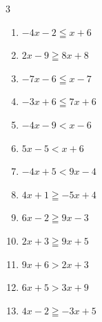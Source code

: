 \begin{multicols}{3}
\begin{enumerate}
  \item $-4x-2\leqq x+6$


  \item $2x-9\geqq 8x+8$


  \item $-7x-6\leqq x-7$


\columnbreak %

  \item $-3x+6\leqq 7x+6$

        \phantom{$\displaystyle x\geqq 0$}

  \item $-4x-9<x-6$


  \item $5x-5<x+6$


  \item $-4x+5<9x-4$


  \item $4x+1\geqq -5x+4$


  \item $6x-2\geqq 9x-3$


  \item $2x+3\geqq 9x+5$


  \item $9x+6>2x+3$


  \item $6x+5>3x+9$


  \item $4x-2\geqq -3x+5$

        \phantom{$\displaystyle x\geqq 1$}


\end{enumerate}
\end{multicols}

